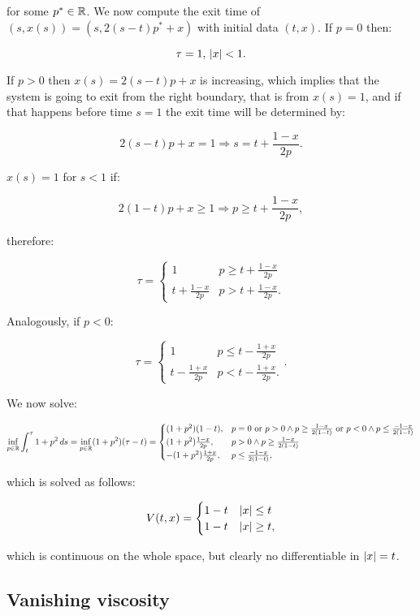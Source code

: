 for some $p^{\ast}\in\mathbb{R}$. We now compute the exit time of $(s,x(s))=(s,2(s-t)p^{\ast}+x)$ with initial data $(t,x)$. If $p=0$ then:

\[\tau=1,\,\abs{x}<1.\]

If $p>0$ then $x(s)=2(s-t)p+x$ is increasing, which implies that the system is going to exit from the right boundary, that is from $x(s)=1$, and if 
that happens before time $s=1$ the exit time will be determined by:

\[2(s-t)p+x=1\Rightarrow s=t+\frac{1-x}{2p}.\]

$x(s)=1$ for $s<1$ if:

\[2(1-t)p+x\geq1\Rightarrow p\geq t+\frac{1-x}{2p},\]

therefore:

\[\tau=\begin{cases}
    1 & p\geq t+\frac{1-x}{2p} \\
    t+\frac{1-x}{2p} & p> t+\frac{1-x}{2p}.
\end{cases}\]

Analogously, if $p<0$:

\[\tau=\begin{cases}
    1 & p\leq t-\frac{1+x}{2p} \\
    t-\frac{1+x}{2p} & p< t-\frac{1+x}{2p}.
\end{cases}.\]

We now solve:

\[\inf_{p\in\mathbb{R}} \int_t^{\tau}1+p^2\,ds=\inf_{p\in\mathbb{R}}(1+p^2)(\tau-t)=\begin{cases}
    (1+p^2)(1-t), & p=0\text{ or }p>0\land p\geq \frac{1-x}{2(1-t)}\text{ or }p<0\land p\leq\frac{-1-x}{2(1-t)}\\
    (1+p^2)\frac{1-x}{2p}, & p>0\land p\geq \frac{1-x}{2(1-t)} \\
    -(1+p^2)\frac{1+x}{2p}, & p\leq\frac{-1-x}{2(1-t)},
\end{cases}\]

which is solved as follows:

\[V(t,x)=\begin{cases}
    1-t & \abs{x}\leq t \\
    1-t& \abs{x}\geq t,
\end{cases}\]

which is continuous on the whole space, but clearly no differentiable in $\abs{x}=t$.

\subsection{Vanishing viscosity}

